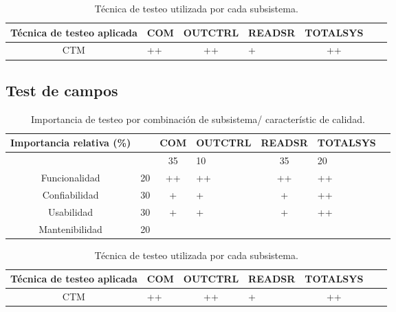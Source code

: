 \documentclass[
11pt, %
]{charter}
\begin{document}
\begin{table}[ht]
    \centering
    \begin{tabularx}{\linewidth}{@{}|c|X|c|X|c|X|c|@{}}\hline \hline
    \rowcolor[HTML]{d6c6c3}
 Técnica de testeo aplicada & COM & OUTCTRL & READSR & TOTALSYS\\
        \hline
      CTM & ++ &++ &+ & ++ \\
        \hline
    \end{tabularx}
    \caption{Técnica de testeo utilizada por cada subsistema.}
\end{table}

\subsection{Test de campos}
\begin{table}[ht]
    \centering
    \begin{tabularx}{\linewidth}{@{}|c|X|c|X|c|X|c|@{}}\hline \hline
    \rowcolor[HTML]{d6c6c3}
 Importancia relativa (\%)& &  COM & OUTCTRL & READSR & TOTALSYS\\
        \hline
       
            &  &35 & 10 &35 & 20                          \\
        Funcionalidad    & 20 & ++ & ++ & ++ & ++		\\
        Confiabilidad    & 30 & + & + & + & ++                        \\
        Usabilidad       & 30 & + & + & + & ++                        \\
        Mantenibilidad   & 20 &  & &  &                         \\
        \hline
    \end{tabularx}
    \caption{Importancia de testeo por combinación de subsistema/ característic de calidad.}
\end{table}


\begin{table}[ht]
    \centering
    \begin{tabularx}{\linewidth}{@{}|c|X|c|X|c|X|c|@{}}\hline \hline
    \rowcolor[HTML]{d6c6c3}
 Técnica de testeo aplicada & COM & OUTCTRL & READSR & TOTALSYS\\
        \hline
      CTM & ++ &++ &+ & ++ \\
        \hline
    \end{tabularx}
    \caption{Técnica de testeo utilizada por cada subsistema.}
\end{table}
\end{document}
